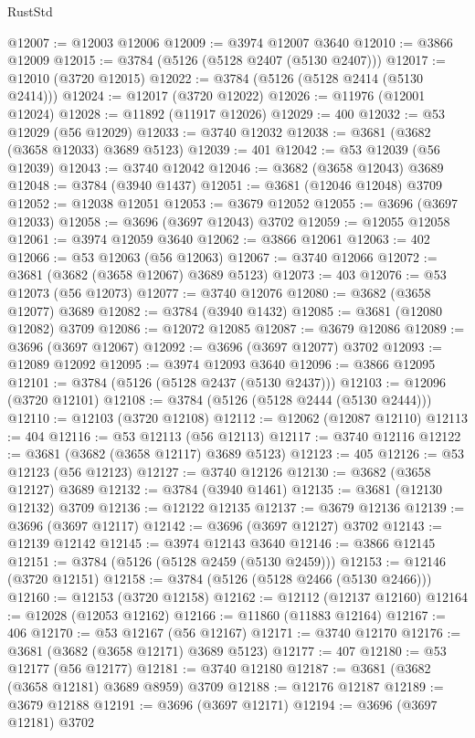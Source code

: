 \begin{lexlean}{RustStd}
\begin{coremodule}
@12007 := @12003 @12006
@12009 := @3974 @12007 @3640
@12010 := @3866 @12009
@12015 := @3784 (@5126 (@5128 @2407 (@5130 @2407)))
@12017 := @12010 (@3720 @12015)
@12022 := @3784 (@5126 (@5128 @2414 (@5130 @2414)))
@12024 := @12017 (@3720 @12022)
@12026 := @11976 (@12001 @12024)
@12028 := @11892 (@11917 @12026)
@12029 := 400
@12032 := @53 @12029 (@56 @12029)
@12033 := @3740 @12032
@12038 := @3681 (@3682 (@3658 @12033) @3689 @5123)
@12039 := 401
@12042 := @53 @12039 (@56 @12039)
@12043 := @3740 @12042
@12046 := @3682 (@3658 @12043) @3689
@12048 := @3784 (@3940 @1437)
@12051 := @3681 (@12046 @12048) @3709
@12052 := @12038 @12051
@12053 := @3679 @12052
@12055 := @3696 (@3697 @12033)
@12058 := @3696 (@3697 @12043) @3702
@12059 := @12055 @12058
@12061 := @3974 @12059 @3640
@12062 := @3866 @12061
@12063 := 402
@12066 := @53 @12063 (@56 @12063)
@12067 := @3740 @12066
@12072 := @3681 (@3682 (@3658 @12067) @3689 @5123)
@12073 := 403
@12076 := @53 @12073 (@56 @12073)
@12077 := @3740 @12076
@12080 := @3682 (@3658 @12077) @3689
@12082 := @3784 (@3940 @1432)
@12085 := @3681 (@12080 @12082) @3709
@12086 := @12072 @12085
@12087 := @3679 @12086
@12089 := @3696 (@3697 @12067)
@12092 := @3696 (@3697 @12077) @3702
@12093 := @12089 @12092
@12095 := @3974 @12093 @3640
@12096 := @3866 @12095
@12101 := @3784 (@5126 (@5128 @2437 (@5130 @2437)))
@12103 := @12096 (@3720 @12101)
@12108 := @3784 (@5126 (@5128 @2444 (@5130 @2444)))
@12110 := @12103 (@3720 @12108)
@12112 := @12062 (@12087 @12110)
@12113 := 404
@12116 := @53 @12113 (@56 @12113)
@12117 := @3740 @12116
@12122 := @3681 (@3682 (@3658 @12117) @3689 @5123)
@12123 := 405
@12126 := @53 @12123 (@56 @12123)
@12127 := @3740 @12126
@12130 := @3682 (@3658 @12127) @3689
@12132 := @3784 (@3940 @1461)
@12135 := @3681 (@12130 @12132) @3709
@12136 := @12122 @12135
@12137 := @3679 @12136
@12139 := @3696 (@3697 @12117)
@12142 := @3696 (@3697 @12127) @3702
@12143 := @12139 @12142
@12145 := @3974 @12143 @3640
@12146 := @3866 @12145
@12151 := @3784 (@5126 (@5128 @2459 (@5130 @2459)))
@12153 := @12146 (@3720 @12151)
@12158 := @3784 (@5126 (@5128 @2466 (@5130 @2466)))
@12160 := @12153 (@3720 @12158)
@12162 := @12112 (@12137 @12160)
@12164 := @12028 (@12053 @12162)
@12166 := @11860 (@11883 @12164)
@12167 := 406
@12170 := @53 @12167 (@56 @12167)
@12171 := @3740 @12170
@12176 := @3681 (@3682 (@3658 @12171) @3689 @5123)
@12177 := 407
@12180 := @53 @12177 (@56 @12177)
@12181 := @3740 @12180
@12187 := @3681 (@3682 (@3658 @12181) @3689 @8959) @3709
@12188 := @12176 @12187
@12189 := @3679 @12188
@12191 := @3696 (@3697 @12171)
@12194 := @3696 (@3697 @12181) @3702

\end{coremodule}
\end{lexlean}
